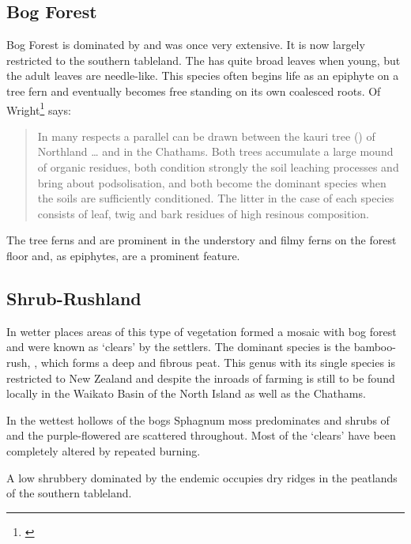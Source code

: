 \subsection{Bog Forest}

Bog Forest is dominated by  and was once very extensive.
It is now largely restricted to the southern tableland.
The  has quite broad leaves when young, but the adult leaves are needle-like.
This species often begins life as an epiphyte on a tree fern and eventually becomes free standing on its own coalesced roots.
Of  Wright\footnote{\cite{wright1959soils}} says:

\begin{quote}
	In many respects a parallel can be drawn between the kauri tree () of Northland … and  in the Chathams.
	Both trees accumulate a large mound of organic residues, both condition strongly the soil leaching processes and bring about podsolisation, and both become the dominant species when the soils are sufficiently conditioned.
	The litter in the case of each species consists of leaf, twig and bark residues of high resinous composition.
\end{quote}

The tree ferns  and  are prominent in the understory and filmy ferns on the forest floor and, as epiphytes, are a prominent feature.

\subsection{Shrub-Rushland}

In wetter places areas of this type of vegetation formed a mosaic with bog forest and were known as `clears' by the settlers.
The dominant species is the bamboo-rush, , which forms a deep and fibrous peat.
This genus with its single species is restricted to New Zealand and despite the inroads of farming is still to be found locally in the Waikato Basin of the North Island as well as the Chathams.

In the wettest hollows of the bogs Sphagnum moss predominates and shrubs of  and the purple-flowered  are scattered throughout.
Most of the `clears' have been completely altered by repeated burning.

A low shrubbery dominated by the endemic  occupies dry ridges in the peatlands of the southern tableland.

